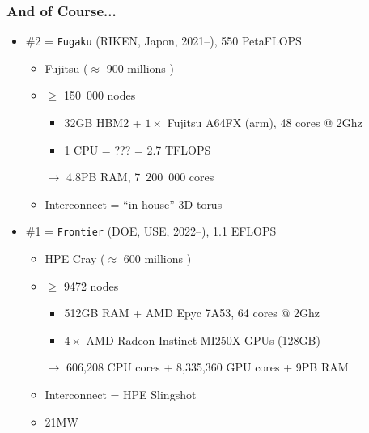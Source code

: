 \documentclass[xcolor={x11names,svgnames,psnames}]{beamer}
\newcommand{\euro}{\EUR\xspace}
\begin{document}
\begin{frame}
  \frametitle{And of Course...}

  \begin{itemize}
  \item \#2 = \texttt{Fugaku} (RIKEN, Japon, 2021--), 550 PetaFLOPS
    \begin{itemize}
    \item Fujitsu ($\approx$ 900 millions \euro)
    \item $\geq$ 150~000 nodes
      \begin{itemize}
      \item 32GB HBM2 + $1 \times$ Fujitsu A64FX (arm), 48 cores @ 2Ghz
      \item 1 CPU = ??? \euro = 2.7 TFLOPS
      \end{itemize}
    \item[$\rightarrow$] 4.8PB RAM, 7~200~000 cores
    \item Interconnect = ``in-house'' 3D torus
    \end{itemize}
  \end{itemize}

  \pause
  
  \begin{itemize}
  \item \#1 = \texttt{Frontier} (DOE, USE, 2022--), 1.1 EFLOPS
    \begin{itemize}
    \item HPE Cray ($\approx$ 600 millions \euro)
    \item $\geq$ 9472 nodes
      \begin{itemize}
      \item 512GB RAM + AMD Epyc 7A53, 64 cores @ 2Ghz
      \item $4 \times$ AMD Radeon Instinct MI250X GPUs (128GB) 
      \end{itemize}
    \item[$\rightarrow$] 606,208 CPU cores + 8,335,360 GPU cores + 9PB RAM
    \item Interconnect = HPE Slingshot
    \item 21MW
    \end{itemize}
  \end{itemize}


\end{frame}

\end{document}
